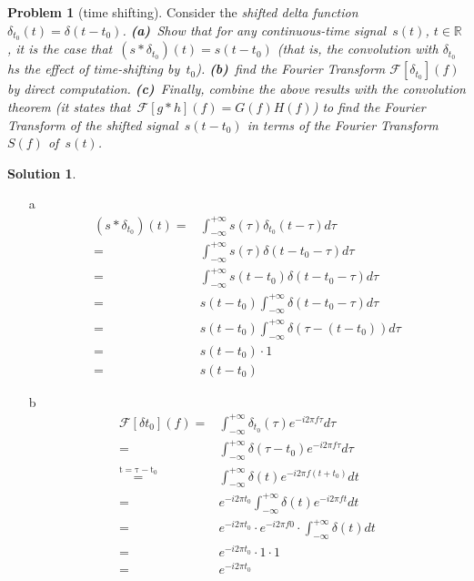 \documentclass[11pt]{article}
\theoremstyle{plain}
\theoremstyle{definition}
\newtheorem{problem}{Problem}
\newtheorem{solution}{Solution}
\theoremstyle{remark}
\begin{document}
\begin{problem}[time shifting]
Consider the \em shifted \em delta function
$\delta_{t_0}(t)=\delta(t-t_0)$. {\bf(a)}~Show that
for any continuous-time signal~$s(t)$, $t\in \mathbb{R}$,
it is the case that~$(s\ast\delta_{t_0})(t)=s(t-t_0)$
(that is, the convolution with $\delta_{t_0}$ hs the effect
of time-shifting by~$t_0$). {\bf(b)}~find the 
Fourier Transform $\mathcal{F}[\delta_{t_0}](f)$
by direct computation.  
{\bf(c)}~Finally, 
combine the above results with the convolution theorem
(it states that~$\mathcal{F}[g\ast h](f)=G(f)H(f)$)
to find the Fourier Transform of the shifted signal~$s(t-t_0)$
in terms of the Fourier Transform~$S(f)$ of~$s(t)$.
\end{problem}
\begin{solution}
	\begin{enumerate}
		\item[a] 	
		\begin{eqnarray*}
			(s*\delta_{t_0})(t) = & \int_{-\infty}^{+\infty} s(\tau) \delta_{t_0} (t-\tau) d\tau\\
			= & \int_{-\infty}^{+\infty} s(\tau) \delta (t- t_0 -\tau) d\tau\\
			= & \int_{-\infty}^{+\infty} s(t-t_0) \delta(t-t_0 -\tau) d\tau \\
			= & s(t-t_0) \int_{-\infty}^{+\infty} \delta (t-t_0 -\tau) d\tau \\
			= & s(t-t_0) \int_{-\infty}^{+\infty} \delta (\tau - (t-t_0)) d\tau \\
			= & s(t-t_0) \cdot 1 \\
			= & s(t-t_0)
		\end{eqnarray*}
		
		\item[b]
		\begin{eqnarray*}
		\mathcal{F}[\delta t_0] (f) = & \int_{-\infty}^{+\infty} \delta_{t_0} (\tau) e^{-i 2\pi f \tau} d\tau\\
			= & \int_{-\infty}^{+\infty} \delta (\tau - t_0) e^{-i2\pi f \tau} d\tau\\
			 \overset{\mathrm{t = \tau - t_0}}{=} & \int_{-\infty}^{+\infty} \delta (t) e^{-i 2\pi f(t+t_0)} dt\\
			= & e^{-i2\pi t_0} \int_{-\infty}^{+\infty}  \delta (t) e^{-i2\pi ft}dt\\
			= &  e^{-i2\pi t_0} \cdot e^{-i2\pi f 0} \cdot \int_{-\infty}^{+\infty} \delta (t) dt\\
			= & e^{-i2\pi t_0}  \cdot 1 \cdot 1\\
			= & e^{-i2\pi t_0}
		\end{eqnarray*}
		

\end{enumerate}
\end{solution}
\end{document}
